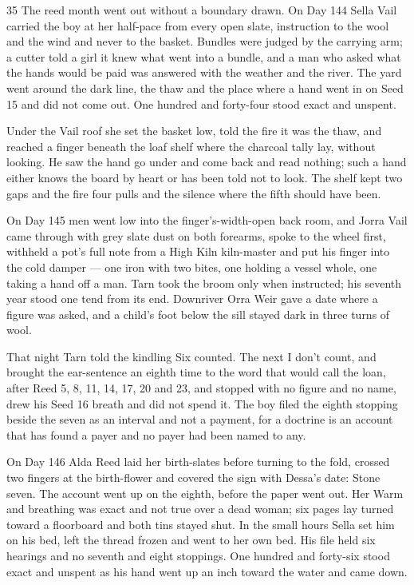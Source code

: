 \begin{CRchronicle}{35}
The reed month went out without a boundary drawn. On Day 144 Sella Vail carried the boy at her half-pace from every open slate, instruction to the wool and the wind and never to the basket. Bundles were judged by the carrying arm; a cutter told a girl it knew what went into a bundle, and a man who asked what the hands would be paid was answered with the weather and the river. The yard went around the dark line, the thaw and the place where a hand went in on Seed 15 and did not come out. One hundred and forty-four stood exact and unspent.

Under the Vail roof she set the basket low, told the fire it was the thaw, and reached a finger beneath the loaf shelf where the charcoal tally lay, without looking. He saw the hand go under and come back and read nothing; such a hand either knows the board by heart or has been told not to look. The shelf kept two gaps and the fire four pulls and the silence where the fifth should have been.

On Day 145 men went low into the finger’s-width-open back room, and Jorra Vail came through with grey slate dust on both forearms, spoke to the wheel first, withheld a pot’s full note from a High Kiln kiln-master and put his finger into the cold damper --- one iron with two bites, one holding a vessel whole, one taking a hand off a man. Tarn took the broom only when instructed; his seventh year stood one tend from its end. Downriver Orra Weir gave a date where a figure was asked, and a child’s foot below the sill stayed dark in three turns of wool.

That night Tarn told the kindling Six counted. The next I don’t count, and brought the ear-sentence an eighth time to the word that would call the loan, after Reed 5, 8, 11, 14, 17, 20 and 23, and stopped with no figure and no name, drew his Seed 16 breath and did not spend it. The boy filed the eighth stopping beside the seven as an interval and not a payment, for a doctrine is an account that has found a payer and no payer had been named to any.

On Day 146 Alda Reed laid her birth-slates before turning to the fold, crossed two fingers at the birth-flower and covered the sign with Dessa’s date: Stone seven. The account went up on the eighth, before the paper went out. Her Warm and breathing was exact and not true over a dead woman; six pages lay turned toward a floorboard and both tins stayed shut. In the small hours Sella set him on his bed, left the thread frozen and went to her own bed. His file held six hearings and no seventh and eight stoppings. One hundred and forty-six stood exact and unspent as his hand went up an inch toward the water and came down.
\end{CRchronicle}
